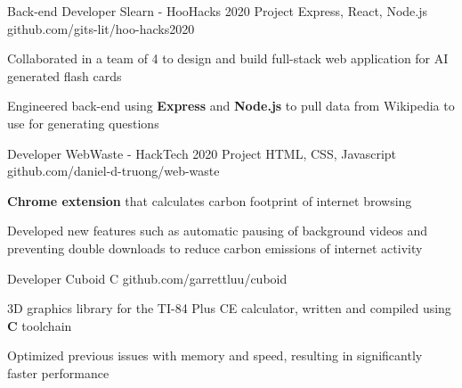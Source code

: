\documentclass[]{awesome-cv}
\begin{document}
\vspace{-5mm}
\begin{cventries}

	\cventry
  {Back-end Developer}
  {Slearn - HooHacks 2020 Project}
	{Express, React, Node.js}
	{github.com/gits-lit/hoo-hacks2020}
  {\begin{cvitems}
    \item{Collaborated in a team of 4 to design and build full-stack web
      application for AI generated flash cards}
    \item{Engineered back-end using \textbf{Express} and \textbf{Node.js} to
      pull data from Wikipedia to use for generating questions}
    \end{cvitems}}

  \vspace{-3mm}
	\cventry
  {Developer}
  {WebWaste - HackTech 2020 Project}
  {HTML, CSS, Javascript}
	{github.com/daniel-d-truong/web-waste}
  {\begin{cvitems}
    \item{\textbf{Chrome extension} that calculates carbon footprint of
      internet browsing}
    \item{Developed new features such as automatic pausing of background
      videos and \\ preventing double downloads to reduce carbon emissions of
      internet activity}
    \end{cvitems}}

  \vspace{-3mm}
	\cventry
  {Developer}
	{Cuboid}
	{C}
	{github.com/garrettluu/cuboid}
  {\begin{cvitems}
	  \item{3D graphics library for the TI-84 Plus CE calculator, written and
      compiled using \textbf{C} toolchain}
    \item{Optimized previous issues with memory and speed, resulting in
      significantly faster performance}
    \end{cvitems}}

\end{cventries}

\end{document}
